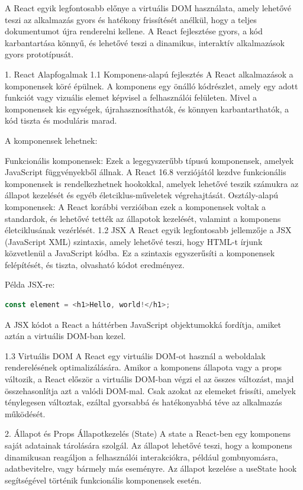 \documentclass[colorlinks]{thesis-kando}
\theoremstyle{definition}
\theoremstyle{remark}
\begin{document}
A React egyik legfontosabb előnye a virtuális DOM használata, amely lehetővé teszi az alkalmazás gyors és hatékony frissítését anélkül, hogy a teljes dokumentumot újra renderelni kellene. A React fejlesztése gyors, a kód karbantartása könnyű, és lehetővé teszi a dinamikus, interaktív alkalmazások gyors prototípusát.

1. React Alapfogalmak
1.1 Komponens-alapú fejlesztés
A React alkalmazások a komponensek köré épülnek. A komponens egy önálló kódrészlet, amely egy adott funkciót vagy vizuális elemet képvisel a felhasználói felületen. Mivel a komponensek kis egységek, újrahasznosíthatók, és könnyen karbantarthatók, a kód tiszta és moduláris marad.

A komponensek lehetnek:

Funkcionális komponensek: Ezek a legegyszerűbb típusú komponensek, amelyek JavaScript függvényekből állnak. A React 16.8 verziójától kezdve funkcionális komponensek is rendelkezhetnek hookokkal, amelyek lehetővé teszik számukra az állapot kezelését és egyéb életciklus-műveletek végrehajtását.
Osztály-alapú komponensek: A React korábbi verzióiban ezek a komponensek voltak a standardok, és lehetővé tették az állapotok kezelését, valamint a komponens életciklusának vezérlését.
1.2 JSX
A React egyik legfontosabb jellemzője a JSX (JavaScript XML) szintaxis, amely lehetővé teszi, hogy HTML-t írjunk közvetlenül a JavaScript kódba. Ez a szintaxis egyszerűsíti a komponensek felépítését, és tiszta, olvasható kódot eredményez.

Példa JSX-re:
\begin{lstlisting}[language=JavaScript]
const element = <h1>Hello, world!</h1>;
\end{lstlisting}
A JSX kódot a React a háttérben JavaScript objektumokká fordítja, amiket aztán a virtuális DOM-ban kezel.

1.3 Virtuális DOM
A React egy virtuális DOM-ot használ a weboldalak renderelésének optimalizálására. Amikor a komponens állapota vagy a props változik, a React először a virtuális DOM-ban végzi el az összes változást, majd összehasonlítja azt a valódi DOM-mal. Csak azokat az elemeket frissíti, amelyek ténylegesen változtak, ezáltal gyorsabbá és hatékonyabbá téve az alkalmazás működését.

2. Állapot és Props
\label{2.1} Állapotkezelés (State)
A state a React-ben egy komponens saját adatainak tárolására szolgál. Az állapot lehetővé teszi, hogy a komponens dinamikusan reagáljon a felhasználói interakciókra, például gombnyomásra, adatbevitelre, vagy bármely más eseményre. Az állapot kezelése a useState hook segítségével történik funkcionális komponensek esetén.
\end{document}
